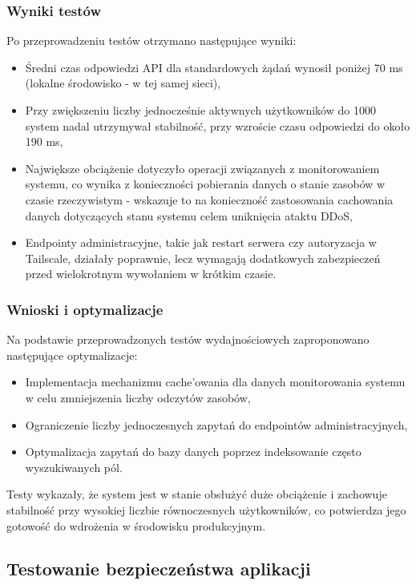 \subsubsection{Wyniki testów}
Po przeprowadzeniu testów otrzymano następujące wyniki:
\begin{itemize}
    \item Średni czas odpowiedzi API dla standardowych żądań wynosił poniżej 70 ms (lokalne środowisko - w tej samej sieci),
    \item Przy zwiększeniu liczby jednocześnie aktywnych użytkowników do 1000 system nadal utrzymywał stabilność, przy wzroście czasu odpowiedzi do około 190 ms,
    \item Największe obciążenie dotyczyło operacji związanych z monitorowaniem systemu, co wynika z konieczności pobierania danych o stanie zasobów w czasie rzeczywistym - wskazuje to na konieczność zastosowania cachowania danych dotyczących stanu systemu celem uniknięcia ataktu DDoS,
    \item Endpointy administracyjne, takie jak restart serwera czy autoryzacja w Tailscale, działały poprawnie, lecz wymagają dodatkowych zabezpieczeń przed wielokrotnym wywołaniem w krótkim czasie.
\end{itemize}

\subsubsection{Wnioski i optymalizacje}
Na podstawie przeprowadzonych testów wydajnościowych zaproponowano następujące optymalizacje:
\begin{itemize}
    \item Implementacja mechanizmu cache'owania dla danych monitorowania systemu w celu zmniejszenia liczby odczytów zasobów,
    \item Ograniczenie liczby jednoczesnych zapytań do endpointów administracyjnych,
    \item Optymalizacja zapytań do bazy danych poprzez indeksowanie często wyszukiwanych pól.
\end{itemize}

Testy wykazały, że system jest w stanie obsłużyć duże obciążenie i zachowuje stabilność przy wysokiej liczbie równoczesnych użytkowników, co potwierdza jego gotowość do wdrożenia w środowisku produkcyjnym.

\subsection{Testowanie bezpieczeństwa aplikacji}

